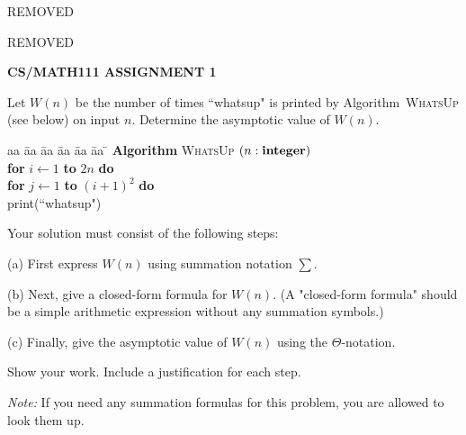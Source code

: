 \documentclass{article}
\begin{document}
\centerline{REMOVED}
\centerline{REMOVED}
\centerline{\large \bf CS/MATH111 ASSIGNMENT 1}

\vskip 0.1in

\vskip 0.2in


\begin{problem}
Let $W(n)$ be the number of
times ``whatsup" is printed by Algorithm~\textsc{WhatsUp} (see below) on input $n$.
Determine the asymptotic value of $W(n)$.


\begin{tabbing}
aa \= aa \= aa \= aa \= aa \= aa \= \kill
\textbf{Algorithm} \textsc{WhatsUp} $(n: \mbox{\bf integer})$ \\
      \> \textbf{for} $i \leftarrow 1$ \textbf{to} $2n$
                         \textbf{do} \\
      \> \> \textbf{for} $j \leftarrow 1$ \textbf{to} $(i+1)^2$ \textbf{do} \\
      \> \> \> print(``whatsup")
\end{tabbing}

Your solution must consist of the following steps:
%
\begin{description}
\item{(a)} First express $W(n)$ using summation notation $\sum$.
\item{(b)} Next, give a closed-form formula for $W(n)$. (A "closed-form formula"  
			should be a simple arithmetic expression without 
			any summation symbols.)
\item{(c)}  Finally, give the asymptotic value of $W(n)$ using the $\Theta$-notation. 
\end{description}
%
Show your work. Include a justification for each step. 

\smallskip
\noindent
\emph{Note:} If you need any summation formulas for this problem, you are allowed to
look them up.
\end{problem}
\end{document}
